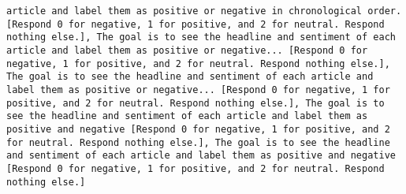 \begin{lstlisting}[label=lst:poor_performing_prompts]
article and label them as positive or negative in chronological order. [Respond 0 for negative, 1 for positive, and 2 for neutral. Respond nothing else.], The goal is to see the headline and sentiment of each article and label them as positive or negative... [Respond 0 for negative, 1 for positive, and 2 for neutral. Respond nothing else.], The goal is to see the headline and sentiment of each article and label them as positive or negative... [Respond 0 for negative, 1 for positive, and 2 for neutral. Respond nothing else.], The goal is to see the headline and sentiment of each article and label them as positive and negative [Respond 0 for negative, 1 for positive, and 2 for neutral. Respond nothing else.], The goal is to see the headline and sentiment of each article and label them as positive and negative [Respond 0 for negative, 1 for positive, and 2 for neutral. Respond nothing else.]

\end{lstlisting}
